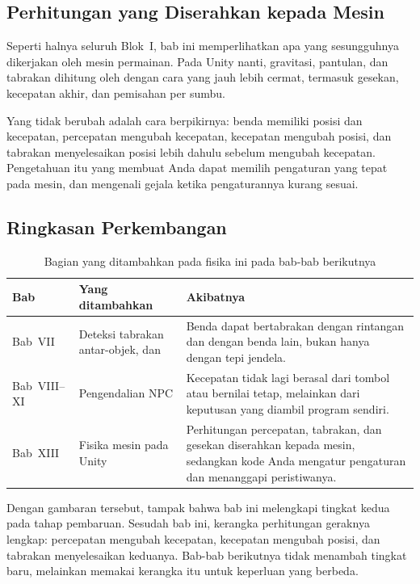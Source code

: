 \subsection{Perhitungan yang Diserahkan kepada Mesin}

Seperti halnya seluruh Blok~I, bab ini memperlihatkan apa yang sesungguhnya
dikerjakan oleh mesin permainan. Pada Unity nanti, gravitasi, pantulan, dan
tabrakan dihitung oleh  dengan cara yang jauh lebih cermat,
termasuk gesekan, kecepatan akhir, dan pemisahan per sumbu.

Yang tidak berubah adalah cara berpikirnya: benda memiliki posisi dan
kecepatan, percepatan mengubah kecepatan, kecepatan mengubah posisi, dan
tabrakan menyelesaikan posisi lebih dahulu sebelum mengubah kecepatan.
Pengetahuan itu yang membuat Anda dapat memilih pengaturan yang tepat pada
mesin, dan mengenali gejala ketika pengaturannya kurang sesuai.

\subsection{Ringkasan Perkembangan}

\begin{table}[htbp]
\centering
\caption{Bagian yang ditambahkan pada fisika ini pada bab-bab berikutnya}
\label{tab:perkembangan-fisika}
{\setlength{\tabcolsep}{4pt}\footnotesize%
\begin{tabularx}{\textwidth}{@{}C{1.6cm} L{5.0cm} Y@{}}
\toprule
\headrow \textbf{Bab} & \textbf{Yang ditambahkan} & \textbf{Akibatnya} \\
\midrule
Bab~VII & Deteksi tabrakan antar-objek,  dan  &
Benda dapat bertabrakan dengan rintangan dan dengan benda lain, bukan hanya
dengan tepi jendela. \\
\addlinespace
Bab~VIII--XI & Pengendalian NPC &
Kecepatan tidak lagi berasal dari tombol atau bernilai tetap, melainkan dari
keputusan yang diambil program sendiri. \\
\addlinespace
Bab~XIII & Fisika mesin pada Unity &
Perhitungan percepatan, tabrakan, dan gesekan diserahkan kepada mesin,
sedangkan kode Anda mengatur pengaturan dan menanggapi peristiwanya. \\
\bottomrule
\end{tabularx}}
\end{table}

Dengan gambaran tersebut, tampak bahwa bab ini melengkapi tingkat kedua pada
tahap pembaruan. Sesudah bab ini, kerangka perhitungan geraknya lengkap:
percepatan mengubah kecepatan, kecepatan mengubah posisi, dan tabrakan
menyelesaikan keduanya. Bab-bab berikutnya tidak menambah tingkat baru,
melainkan memakai kerangka itu untuk keperluan yang berbeda.
